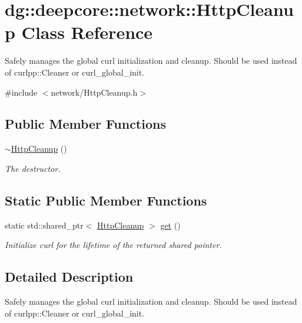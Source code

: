 \hypertarget{classdg_1_1deepcore_1_1network_1_1_http_cleanup}{}\section{dg\+:\+:deepcore\+:\+:network\+:\+:Http\+Cleanup Class Reference}
\label{classdg_1_1deepcore_1_1network_1_1_http_cleanup}


Safely manages the global curl initialization and cleanup. Should be used instead of curlpp\+::\+Cleaner or curl\+\_\+global\+\_\+init.  




{\ttfamily \#include $<$network/\+Http\+Cleanup.\+h$>$}

\subsection*{Public Member Functions}
\begin{DoxyCompactItemize}
\item 
\hyperlink{group___network_module_gac517b1ec291e0fdcef96e8e7af54eb1d}{$\sim$\+Http\+Cleanup} ()
\begin{DoxyCompactList}\small\item\em The destructor. \end{DoxyCompactList}\end{DoxyCompactItemize}
\subsection*{Static Public Member Functions}
\begin{DoxyCompactItemize}
\item 
static std\+::shared\+\_\+ptr$<$ \hyperlink{classdg_1_1deepcore_1_1network_1_1_http_cleanup}{Http\+Cleanup} $>$ \hyperlink{group___network_module_ga039c8cd2070cc244714a28bdeddab074}{get} ()
\begin{DoxyCompactList}\small\item\em Initialize curl for the lifetime of the returned shared pointer. \end{DoxyCompactList}\end{DoxyCompactItemize}


\subsection{Detailed Description}
Safely manages the global curl initialization and cleanup. Should be used instead of curlpp\+::\+Cleaner or curl\+\_\+global\+\_\+init. 